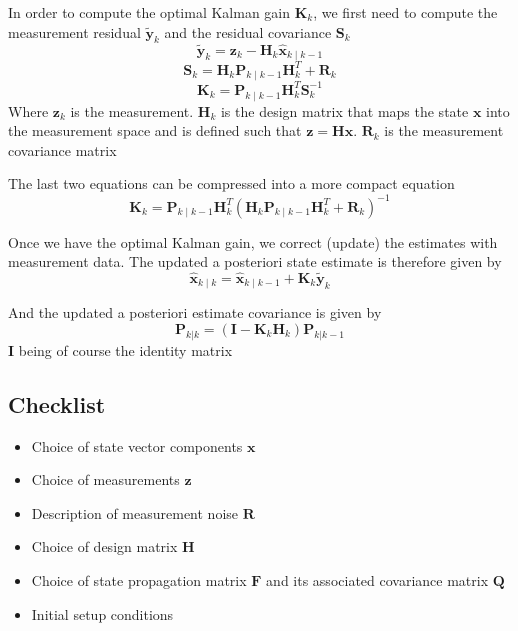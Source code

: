 \documentclass[12pt]{article}
\begin{document}
In order to compute the optimal Kalman gain $\mathbf{K}_k$, we first need to compute the measurement residual $\tilde{\mathbf{y}}_k$ and the residual covariance $\mathbf{S}_k$
\begin{equation}
\tilde{\mathbf{y}}_k = \mathbf{z}_k - \mathbf{H}_k\hat{\mathbf{x}}_{k\mid k-1}
\end{equation}
\begin{equation}
\mathbf{S}_k = \mathbf{H}_k \mathbf{P}_{k\mid k-1} \mathbf{H}_k^T + \mathbf{R}_k
\end{equation}
\begin{equation}
\mathbf{K}_k = \mathbf{P}_{k\mid k-1}\mathbf{H}_k^T \mathbf{S}_k^{-1}
\end{equation}
Where $\mathbf{z}_k$ is the measurement.
$\mathbf{H}_k$ is the design matrix that maps the state $\mathbf{x}$ into the measurement space and is defined such that $\mathbf{z} = \mathbf{H}\mathbf{x}$.
$\mathbf{R}_k$ is the measurement covariance matrix

The last two equations can be compressed into a more compact equation
\begin{equation}
\mathbf{K}_k = \mathbf{P}_{k\mid k-1}\mathbf{H}_k^T (\mathbf{H}_k \mathbf{P}_{k\mid k-1} \mathbf{H}_k^T + \mathbf{R}_k)^{-1}
\end{equation}

Once we have the optimal Kalman gain, we correct (update) the estimates with measurement data.
The updated a posteriori state estimate is therefore given by
\begin{equation}
\hat{\mathbf{x}}_{k\mid k} = \hat{\mathbf{x}}_{k\mid k-1} + \mathbf{K}_k\tilde{\mathbf{y}}_k
\end{equation}

And the updated a posteriori estimate covariance is given by
\begin{equation}
\mathbf{P}_{k|k} = (\mathbf{I} - \mathbf{K}_k \mathbf{H}_k) \mathbf{P}_{k|k-1}
\end{equation}
$\mathbf{I}$ being of course the identity matrix

\subsection{Checklist}

\begin{itemize}
\item Choice of state vector components $\mathbf{x}$
\item Choice of measurements $\mathbf{z}$
\item Description of measurement noise $\mathbf{R}$
\item Choice of design matrix $\mathbf{H}$
\item Choice of state propagation matrix $\mathbf{F}$ and its associated covariance matrix $\mathbf{Q}$
\item Initial setup conditions $ $
\end{itemize}
\end{document}
